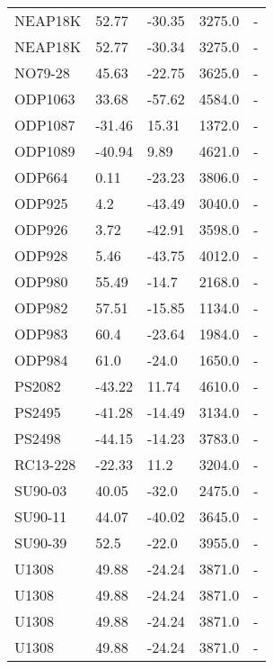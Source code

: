 \begin{longtable}{lllrl}
      NEAP18K &    52.77 &    -30.35 &     3275.0 &         - \\
      NEAP18K &    52.77 &    -30.34 &     3275.0 &         - \\
      NO79-28 &    45.63 &    -22.75 &     3625.0 &         - \\
      ODP1063 &    33.68 &    -57.62 &     4584.0 &         - \\
      ODP1087 &   -31.46 &     15.31 &     1372.0 &         - \\
      ODP1089 &   -40.94 &      9.89 &     4621.0 &         - \\
       ODP664 &     0.11 &    -23.23 &     3806.0 &         - \\
       ODP925 &      4.2 &    -43.49 &     3040.0 &         - \\
       ODP926 &     3.72 &    -42.91 &     3598.0 &         - \\
       ODP928 &     5.46 &    -43.75 &     4012.0 &         - \\
       ODP980 &    55.49 &     -14.7 &     2168.0 &         - \\
       ODP982 &    57.51 &    -15.85 &     1134.0 &         - \\
       ODP983 &     60.4 &    -23.64 &     1984.0 &         - \\
       ODP984 &     61.0 &     -24.0 &     1650.0 &         - \\
       PS2082 &   -43.22 &     11.74 &     4610.0 &         - \\
       PS2495 &   -41.28 &    -14.49 &     3134.0 &         - \\
       PS2498 &   -44.15 &    -14.23 &     3783.0 &         - \\
     RC13-228 &   -22.33 &      11.2 &     3204.0 &         - \\
      SU90-03 &    40.05 &     -32.0 &     2475.0 &         - \\
      SU90-11 &    44.07 &    -40.02 &     3645.0 &         - \\
      SU90-39 &     52.5 &     -22.0 &     3955.0 &         - \\
        U1308 &    49.88 &    -24.24 &     3871.0 &         - \\
        U1308 &    49.88 &    -24.24 &     3871.0 &         - \\
        U1308 &    49.88 &    -24.24 &     3871.0 &         - \\
        U1308 &    49.88 &    -24.24 &     3871.0 &         - \\

\end{longtable}
